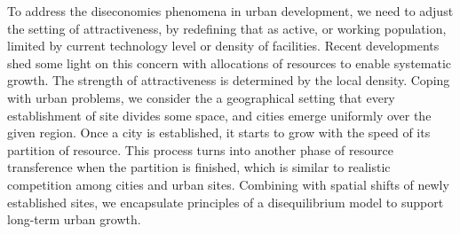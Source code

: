 \documentclass[reprint,unsortedaddress,amsmath,amssymb,aps,prl,showkeys]{revtex4-2}
\begin{document}
To address the diseconomies phenomena in urban development, we need to adjust the setting of attractiveness, by redefining that as active, or working population, limited by current technology level or density of facilities. Recent developments shed some light on this concern with allocations of resources to enable systematic  growth\cite{schaigorodsky2018short}. The strength of attractiveness is determined by the local density. Coping with urban problems, we consider the a geographical setting that every establishment of site divides some space, and cities emerge uniformly over the given region. Once a city is established, it starts to grow with the speed of its partition of resource. This process turns into another phase of resource transference when the partition is finished, which is similar to realistic competition among cities and urban sites. Combining with spatial shifts of newly established sites, we encapsulate principles of a disequilibrium model to support long-term urban growth.
\end{document}
